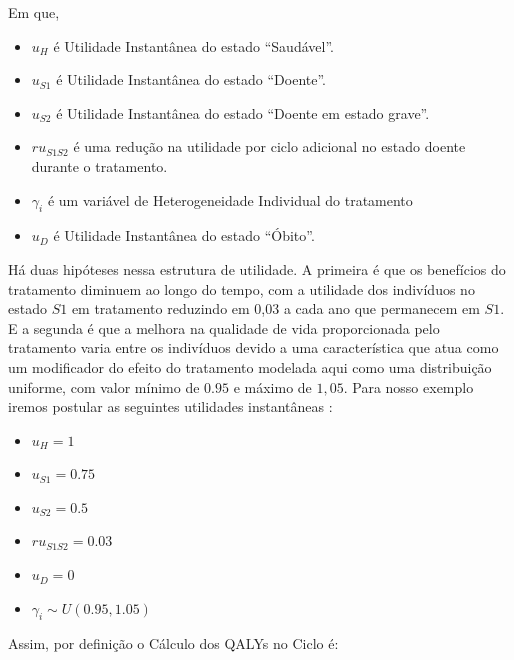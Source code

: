 \documentclass[12pt]{article}
\theoremstyle{break}
\begin{document}
Em que,

\begin{itemize}
    \item $u_H$ é Utilidade Instantânea do estado ``Saudável''.

    \item $u_{S1}$ é Utilidade Instantânea do estado ``Doente''.

    \item $u_{S2}$ é Utilidade Instantânea do estado ``Doente em estado grave''.

    \item $ru_{S1S2}$ é uma redução na utilidade por ciclo adicional no estado doente durante o tratamento.

    \item $\gamma_{i}$ é um variável de Heterogeneidade Individual do tratamento

    \item $u_D$ é Utilidade Instantânea do estado ``Óbito''.

\end{itemize}


Há duas hipóteses nessa estrutura de utilidade. A primeira é que  os benefícios do tratamento diminuem ao longo do tempo, com a utilidade dos indivíduos no estado $S1$ em tratamento reduzindo em 0,03 a cada ano que permanecem em $S1$. E a segunda é que a melhora na qualidade de vida proporcionada pelo tratamento varia entre os indivíduos devido a uma característica que atua como um modificador do efeito do tratamento modelada aqui como uma distribuição uniforme, com valor mínimo de $0.95$ e máximo de $1,05$. Para nosso exemplo iremos postular as seguintes utilidades instantâneas :


\begin{itemize}
    \item $u_H=  1$

    \item $u_{S1} = 0.75$

    \item $u_{S2} =  0.5$

    \item $ru_{S1S2} = 0.03  $

    \item $u_D =  0$

    \item  $\gamma_i \sim U(0.95, 1.05)$


\end{itemize}


Assim, por definição o Cálculo dos QALYs no Ciclo é:
\end{document}
